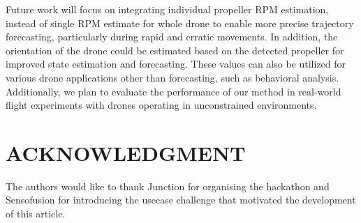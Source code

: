 \documentclass[letterpaper, 10 pt, conference]{ieeeconf}  %
\begin{document}
Future work will focus on integrating individual propeller RPM estimation, instead of single RPM estimate for whole drone to enable more precise trajectory forecasting, particularly during rapid and erratic movements. In addition, the orientation of the drone could be estimated based on the detected propeller for improved state estimation and forecasting. These values can also be utilized for various drone applications other than forecasting, such as behavioral analysis.  
Additionally, we plan to evaluate the performance of our method in real-world flight experiments with drones operating in unconstrained environments.

\section*{ACKNOWLEDGMENT}
The authors would like to thank Junction for organising the hackathon and Sensofusion for introducing the usecase challenge that motivated the development of this article. 


\end{document}
